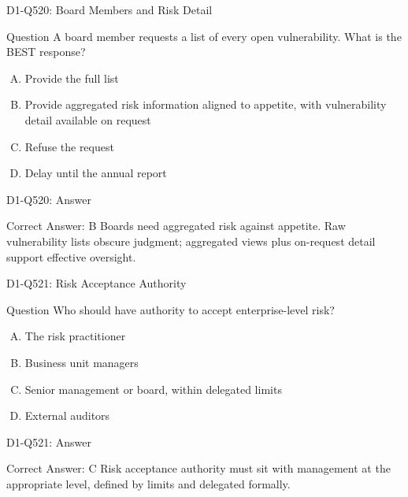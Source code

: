 \documentclass{beamer}
\begin{document}
\begin{frame}{D1-Q520: Board Members and Risk Detail}
	\begin{block}{Question}
		A board member requests a list of every open vulnerability. What is the BEST response?
	\end{block}
	\begin{enumerate}[(A)]
		\item Provide the full list
		\item Provide aggregated risk information aligned to appetite, with vulnerability detail available on request
		\item Refuse the request
		\item Delay until the annual report
	\end{enumerate}
\end{frame}
\begin{frame}{D1-Q520: Answer}
	\begin{block}{Correct Answer: B}
		Boards need aggregated risk against appetite. Raw vulnerability lists obscure judgment; aggregated views plus on-request detail support effective oversight.
	\end{block}
\end{frame}

\begin{frame}{D1-Q521: Risk Acceptance Authority}
	\begin{block}{Question}
		Who should have authority to accept enterprise-level risk?
	\end{block}
	\begin{enumerate}[(A)]
		\item The risk practitioner
		\item Business unit managers
		\item Senior management or board, within delegated limits
		\item External auditors
	\end{enumerate}
\end{frame}
\begin{frame}{D1-Q521: Answer}
	\begin{block}{Correct Answer: C}
		Risk acceptance authority must sit with management at the appropriate level, defined by limits and delegated formally.
	\end{block}
\end{frame}
\end{document}
